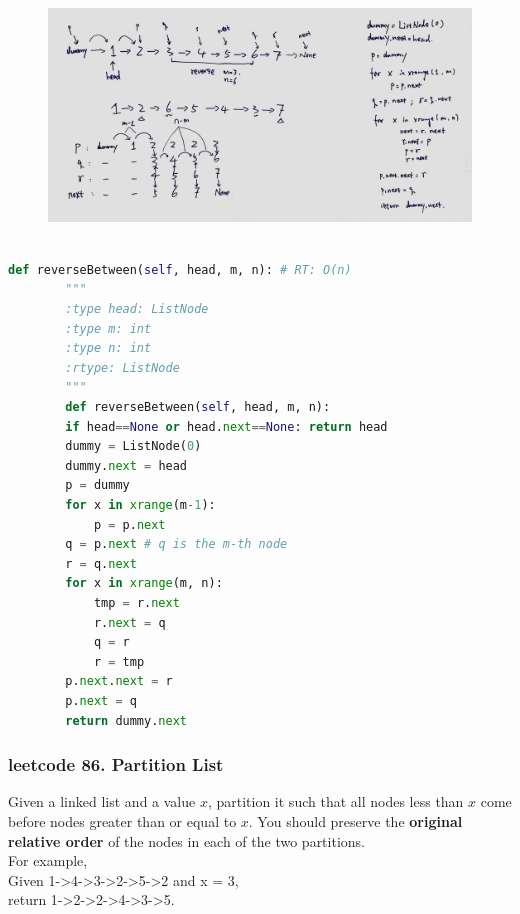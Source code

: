 \documentclass[a4paper,10pt]{article}
\begin{document}
\begin{figure}[h]
    \includegraphics[width=\textwidth]{leetcode92.jpg}
    \centering \\
\end{figure}

\begin{lstlisting}[language=Python, caption=Problem92. Reverse Linked List II]

def reverseBetween(self, head, m, n): # RT: O(n)
        """
        :type head: ListNode
        :type m: int
        :type n: int
        :rtype: ListNode
        """
        def reverseBetween(self, head, m, n):
        if head==None or head.next==None: return head
        dummy = ListNode(0)
        dummy.next = head
        p = dummy
        for x in xrange(m-1):
            p = p.next
        q = p.next # q is the m-th node
        r = q.next
        for x in xrange(m, n):
            tmp = r.next
            r.next = q
            q = r
            r = tmp
        p.next.next = r
        p.next = q
        return dummy.next
\end{lstlisting}


\subsubsection{leetcode 86. Partition List}
Given a linked list and a value $x$, partition it such that all nodes less than $x$ come before nodes greater than or equal to $x$. You should preserve the \textbf{original relative order} of the nodes in each of the two partitions. \\

\noindent For example, \\
\indent Given 1->4->3->2->5->2 and x = 3,\\
\indent return 1->2->2->4->3->5. \\
\end{document}
